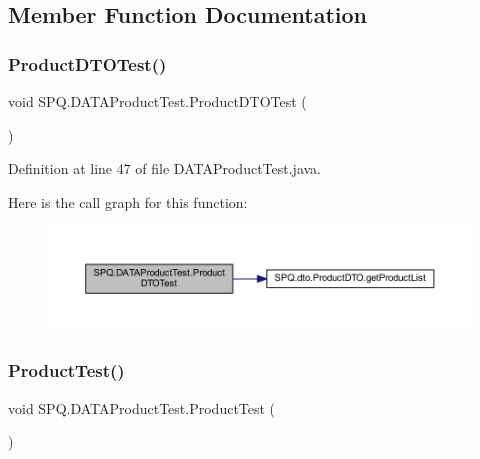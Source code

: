 \subsection{Member Function Documentation}
\mbox{\label{class_s_p_q_1_1_d_a_t_a_product_test_a572f5f092c734feea3c7d8767b4a86c5}} 
\subsubsection{\texorpdfstring{Product\+D\+T\+O\+Test()}{ProductDTOTest()}}
{\footnotesize\ttfamily void S\+P\+Q.\+D\+A\+T\+A\+Product\+Test.\+Product\+D\+T\+O\+Test (\begin{DoxyParamCaption}{ }\end{DoxyParamCaption})}



Definition at line 47 of file D\+A\+T\+A\+Product\+Test.\+java.

Here is the call graph for this function\+:
\nopagebreak
\begin{figure}[H]
\begin{center}
\leavevmode
\includegraphics[width=350pt]{class_s_p_q_1_1_d_a_t_a_product_test_a572f5f092c734feea3c7d8767b4a86c5_cgraph}
\end{center}
\end{figure}
\mbox{\label{class_s_p_q_1_1_d_a_t_a_product_test_afb49da7389a7f4f42159adf87b4a11be}} 
\subsubsection{\texorpdfstring{Product\+Test()}{ProductTest()}}
{\footnotesize\ttfamily void S\+P\+Q.\+D\+A\+T\+A\+Product\+Test.\+Product\+Test (\begin{DoxyParamCaption}{ }\end{DoxyParamCaption})}



